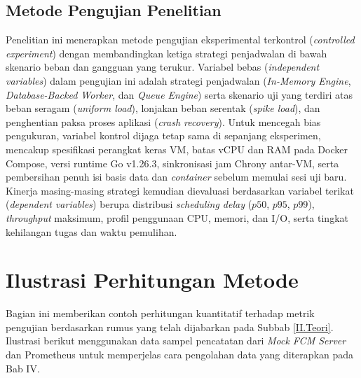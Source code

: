 \subsection{Metode Pengujian Penelitian} \label{III.Metode_Uji}
Penelitian ini menerapkan metode pengujian eksperimental terkontrol (\textit{controlled experiment}) dengan membandingkan ketiga strategi penjadwalan di bawah skenario beban dan gangguan yang terukur. Variabel bebas (\textit{independent variables}) dalam pengujian ini adalah strategi penjadwalan (\textit{In-Memory Engine}, \textit{Database-Backed Worker}, dan \textit{Queue Engine}) serta skenario uji yang terdiri atas beban seragam (\textit{uniform load}), lonjakan beban serentak (\textit{spike load}), dan penghentian paksa proses aplikasi (\textit{crash recovery}). Untuk mencegah bias pengukuran, variabel kontrol dijaga tetap sama di sepanjang eksperimen, mencakup spesifikasi perangkat keras VM, batas vCPU dan RAM pada Docker Compose, versi runtime Go v1.26.3, sinkronisasi jam Chrony antar-VM, serta pembersihan penuh isi basis data dan \textit{container} sebelum memulai sesi uji baru. Kinerja masing-masing strategi kemudian dievaluasi berdasarkan variabel terikat (\textit{dependent variables}) berupa distribusi \textit{scheduling delay} ($p50$, $p95$, $p99$), \textit{throughput} maksimum, profil penggunaan CPU, memori, dan I/O, serta tingkat kehilangan tugas dan waktu pemulihan. \par

\section{Ilustrasi Perhitungan Metode} \label{III.Ilustrasi}
Bagian ini memberikan contoh perhitungan kuantitatif terhadap metrik pengujian berdasarkan rumus yang telah dijabarkan pada Subbab \ref{II.Teori}. Ilustrasi berikut menggunakan data sampel pencatatan dari \textit{Mock FCM Server} dan Prometheus untuk memperjelas cara pengolahan data yang diterapkan pada Bab IV. \par

